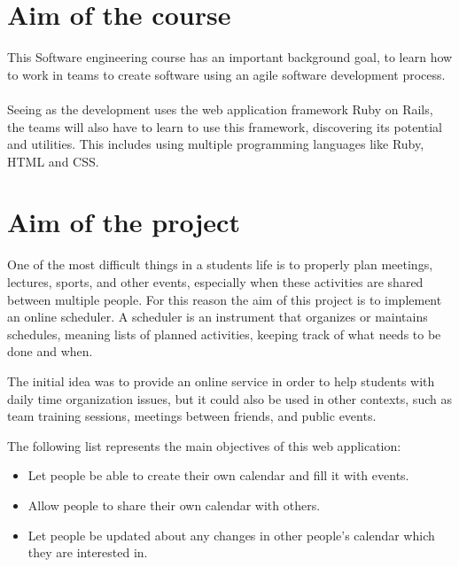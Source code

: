 
\label{Introduction}

\section{Aim of the course}
\vspace{-5mm}
This Software engineering course has an important background goal, to learn how to work in teams to create software using an agile software development process.\\ \\
Seeing as the development uses the web application framework Ruby on Rails, the teams will also have to learn to use this framework, discovering its potential and utilities. This includes using multiple programming languages like Ruby, HTML and CSS.

\section{Aim of the project}
\vspace{-5mm}
One of the most difficult things in a students life is to properly plan meetings, lectures, sports, and other events, especially when these activities are shared between multiple people. For this reason the aim of this project is to implement an online scheduler. A scheduler is an instrument that organizes or maintains schedules, meaning lists of planned activities, keeping track of what needs to be done and when.

The initial idea was to provide an online service in order to help students with daily time organization issues, but it could also be used in other contexts, such as team training sessions, meetings between friends, and public events.

The following list represents the main objectives of this web application:
\vspace{-5mm}
\begin{itemize}
	\setlength{\itemsep}{-5pt}
	\item Let people be able to create their own calendar and fill it with events.
	\item Allow people to share their own calendar with others.
	\item Let people be updated about any changes in other people's calendar which they are interested in.
\end{itemize}